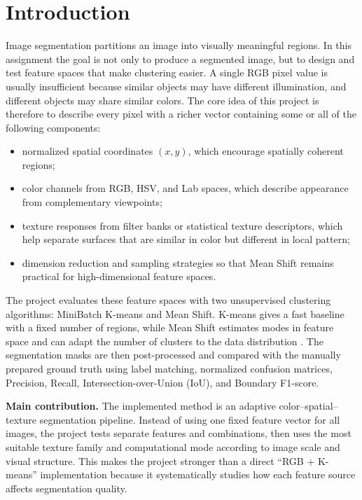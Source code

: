 
\section{Introduction}
Image segmentation partitions an image into visually meaningful regions. In this assignment the goal is not only to produce a segmented image, but to design and test feature spaces that make clustering easier. A single RGB pixel value is usually insufficient because similar objects may have different illumination, and different objects may share similar colors. The core idea of this project is therefore to describe every pixel with a richer vector containing some or all of the following components:
\begin{itemize}
    \item normalized spatial coordinates $(x,y)$, which encourage spatially coherent regions;
    \item color channels from RGB, HSV, and Lab spaces, which describe appearance from complementary viewpoints;
    \item texture responses from filter banks or statistical texture descriptors, which help separate surfaces that are similar in color but different in local pattern;
    \item dimension reduction and sampling strategies so that Mean Shift remains practical for high-dimensional feature spaces.
\end{itemize}

The project evaluates these feature spaces with two unsupervised clustering algorithms: MiniBatch K-means and Mean Shift. K-means gives a fast baseline with a fixed number of regions, while Mean Shift estimates modes in feature space and can adapt the number of clusters to the data distribution \citep{macqueen1967,llyod1982,comaniciu2002}. The segmentation masks are then post-processed and compared with the manually prepared ground truth using label matching, normalized confusion matrices, Precision, Recall, Intersection-over-Union (IoU), and Boundary F1-score.

\textbf{Main contribution.} The implemented method is an adaptive color--spatial--texture segmentation pipeline. Instead of using one fixed feature vector for all images, the project tests separate features and combinations, then uses the most suitable texture family and computational mode according to image scale and visual structure. This makes the project stronger than a direct ``RGB + K-means'' implementation because it systematically studies how each feature source affects segmentation quality.
